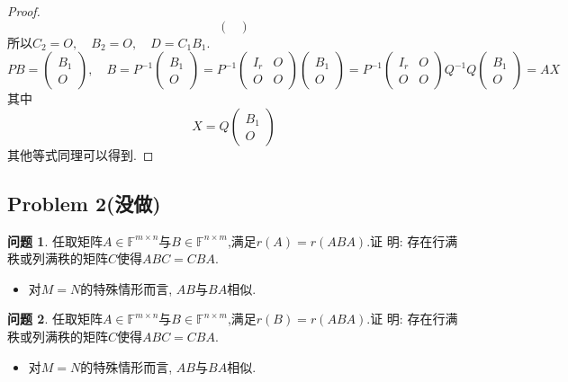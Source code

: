 \documentclass[11pt]{ctexart}
\theoremstyle{definition}
\newtheorem{qqq}{问题}[section]
\numberwithin{equation}{section}
\begin{document}
\begin{enumerate}
\begin{proof}
$$\begin{pmatrix}
                \end{pmatrix}$$
                所以$C_2=O,\quad B_2=O,\quad D=C_1B_1.$\\
                $$PB=\begin{pmatrix}
                    B_1\\O
                \end{pmatrix},\quad B=P^{-1}\begin{pmatrix}
                B_1\\O
                \end{pmatrix}=P^{-1}\begin{pmatrix}
                    I_{r}&O\\O&O
                \end{pmatrix}\begin{pmatrix}
                B_1\\O
                \end{pmatrix}=P^{-1}\begin{pmatrix}
                    I_{r}&O\\O&O
                \end{pmatrix}Q^{-1}Q\begin{pmatrix}
                B_1\\O
                \end{pmatrix}=AX$$ 其中$$X=Q\begin{pmatrix}
                    B_1\\O
                \end{pmatrix}$$
                其他等式同理可以得到.
        
        \end{proof}
    \end{enumerate}



\subsection{Problem 2(没做)}
\begin{qqq}
    任取矩阵$A\in \mathbb{F}^{m\times n}$与$B\in \mathbb{F}^{n\times m}$,满足$r(A)=r(ABA)$.证
    明: 存在行满秩或列满秩的矩阵$C$使得$ABC=CBA$.
    \begin{itemize}
        \item 对$M=N$的特殊情形而言,  $AB$与$BA$相似.
    \end{itemize}
\end{qqq}

\begin{qqq}
    任取矩阵$A\in \mathbb{F}^{m\times n}$与$B\in \mathbb{F}^{n\times m}$,满足$r(B)=r(ABA)$.证
    明: 存在行满秩或列满秩的矩阵$C$使得$ABC=CBA$.
    \begin{itemize}
        \item 对$M=N$的特殊情形而言,  $AB$与$BA$相似.
    \end{itemize}
\end{qqq}
\end{document}
